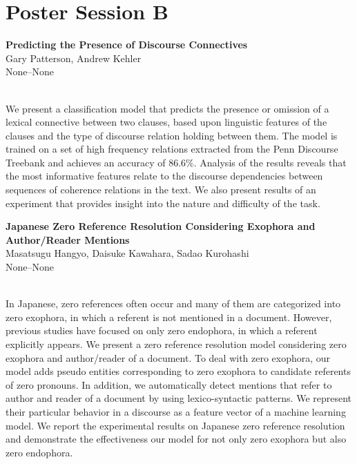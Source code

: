 \documentclass[twoside,makeidx]{book}
\begin{document}
\section{Poster Session B}
\vspace{-1em}
\par\vspace{2em}\noindent%
\begin{minipage}{\linewidth}%
\begin{center}
\textbf{\normalsize Predicting the Presence of Discourse Connectives}\\
\normalsize  Gary Patterson,  Andrew Kehler\\
{\small None--None}\\
\end{center}
\end{minipage}\\[0.5em]
\nopagebreak%
\noindent%
{\small We present a classification model that predicts the presence or omission of a lexical connective between two clauses, based upon linguistic features of the clauses and the type of discourse relation holding between them. The model is trained on a set of high frequency relations extracted from the Penn Discourse Treebank and achieves an accuracy of 86.6\%. Analysis of the results reveals that the most informative features relate to the discourse dependencies between sequences of coherence relations in the text. We also present results of an experiment that provides insight into the nature and difficulty of the task.}
\par\vspace{2em}\noindent%
\begin{minipage}{\linewidth}%
\begin{center}
\textbf{\normalsize Japanese Zero Reference Resolution Considering Exophora and Author/Reader Mentions}\\
\normalsize  Masatsugu Hangyo,  Daisuke Kawahara,  Sadao Kurohashi\\
{\small None--None}\\
\end{center}
\end{minipage}\\[0.5em]
\nopagebreak%
\noindent%
{\small In Japanese, zero references often occur and many of them are  categorized into zero exophora, in which a referent is not mentioned in a document. However, previous studies have focused on only zero endophora, in which a referent explicitly appears. We present a zero reference resolution model considering zero exophora and author/reader of a document. To deal with zero exophora, our model adds pseudo entities corresponding to zero exophora to candidate referents of zero pronouns. In addition, we automatically detect mentions that refer to author and reader of a document by using lexico-syntactic patterns. We represent their particular behavior in a discourse as a feature vector of a machine learning model. We report the experimental results on Japanese zero reference resolution and demonstrate the effectiveness our model for not only zero exophora but also zero endophora.}
\end{document}
